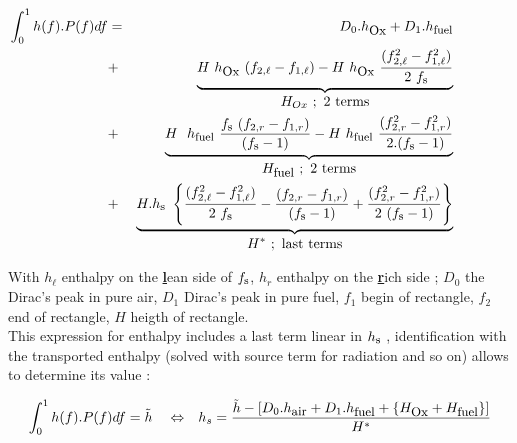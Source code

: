 \vspace{-0.25in}
\begin{eqnarray}
\int_{0}^1 h(f) . P(f) df &=& D_0.h_{\mbox{\small Ox}} + D_1.h_{\mbox{\footnotesize fuel}} \qquad\qquad\nonumber \\
                          &+& \underbrace{H ~ h_{\mbox{\small Ox}} ~ (f_{2,\ell}-f_{1,\ell}) 
                           -  H ~ h_{\mbox{\small Ox}}
\displaystyle{     ~\frac{(f_{2,\ell}^2-f_{1,\ell}^2)}{2~f_{\mbox{\footnotesize s}}} } }_{\displaystyle H_{\small Ox}~;~\mbox{2 terms}}\qquad\qquad\nonumber \\
                          &+& \underbrace{H ~ ~h_{\mbox{\footnotesize fuel}} ~\frac{ f_{\mbox{\footnotesize s}} 
                                              ~(f_{2,r}-f_{1,r}) }{ (f_{\mbox{\footnotesize s}}-1) }
                            - H ~ h_{\mbox{\footnotesize fuel}} ~ \displaystyle{\frac{(f_{2,r}^2-f_{1,r}^2)}{2.(f_{\mbox{\footnotesize s}}-1)} } }_{   \displaystyle H_{\mbox{\small fuel}}~;~\mbox{2 terms} }\qquad\qquad \\
                          &+& \underbrace{ H . h_{\mbox{\footnotesize s}} ~
\displaystyle \left\{ \frac{(f_{2,\ell}^2-f_{1,\ell}^2)}{2~f_{\mbox{\footnotesize s}}} 
                -\frac{(f_{2,r}-f_{1,r})          }{(f_{\mbox{\footnotesize s}}-1)}
                +\frac{(f_{2,r}^2-f_{1,r}^2)}{2~(f_{\mbox{\footnotesize s}}-1)} \right\} }_{\displaystyle H^{*}~;~\mbox{last terms}} \qquad\qquad\nonumber
\end{eqnarray}

With $h_{\ell}$ enthalpy on the \underline{\bf l}ean side of
$f_{\mbox{\footnotesize s}}$, $h_{r}$ enthalpy on the \underline{\bf r}ich side
; $D_0$ the Dirac's peak in pure air, $D_1$ Dirac's peak in
pure fuel, $f_1$ begin of rectangle, $f_2$ end of rectangle, $H$ heigth of rectangle.\\
This expression for enthalpy includes a last term linear in
$h_{\mbox{\footnotesize s}}$ , identification with the transported enthalpy
(solved with source term for radiation and so on) allows to determine its value
:
  
\begin{eqnarray}
\int_{0}^1 h(f) . P(f) df =\tilde{h} \quad  \Leftrightarrow &&
                    h_{s} =\frac{\tilde{h}- [ D_0.h_{\mbox{\small air}} + D_1.h_{\mbox{\small fuel}}+\{ H_{\mbox{\small Ox}} + H_{\mbox{\small fuel}}\} ]}{H^{*}} 
\end{eqnarray} 

